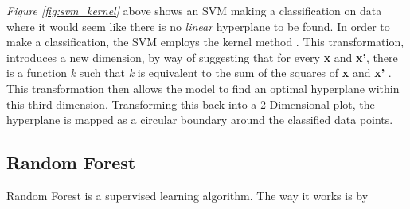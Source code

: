 \documentclass[11pt, a4paper]{article}
\begin{document}
\emph{Figure \ref{fig:svm_kernel}} above shows an SVM making a classification on data where it would seem like there is no \emph{linear} hyperplane to be found. In order to make a classification, the SVM employs the kernel method \cite{ray2017svm}. This transformation, introduces a new dimension, by way of suggesting that for every \textbf{x} and \textbf{x'}, there is a function \emph{k} such that \emph{k} is equivalent to the sum of the squares of \textbf{x} and \textbf{x'} \cite{hofmann2008kernel}. This transformation then allows the model to find an optimal hyperplane within this third dimension. Transforming this back into a 2-Dimensional plot, the hyperplane is mapped as a circular boundary around the classified data points.

\subsection{Random Forest}

Random Forest is a supervised learning algorithm. The way it works is by 
  


\newpage


\end{document}
